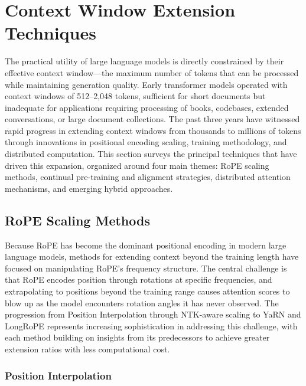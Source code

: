 \documentclass[11pt,letterpaper]{article}
\begin{document}
\section{Context Window Extension Techniques}
\label{sec:window}

The practical utility of large language models is directly constrained by their effective context window---the maximum number of tokens that can be processed while maintaining generation quality. Early transformer models operated with context windows of 512--2,048 tokens, sufficient for short documents but inadequate for applications requiring processing of books, codebases, extended conversations, or large document collections. The past three years have witnessed rapid progress in extending context windows from thousands to millions of tokens through innovations in positional encoding scaling, training methodology, and distributed computation. This section surveys the principal techniques that have driven this expansion, organized around four main themes: RoPE scaling methods, continual pre-training and alignment strategies, distributed attention mechanisms, and emerging hybrid approaches.

\subsection{RoPE Scaling Methods}

Because RoPE \cite{su2024roformer} has become the dominant positional encoding in modern large language models, methods for extending context beyond the training length have focused on manipulating RoPE's frequency structure. The central challenge is that RoPE encodes position through rotations at specific frequencies, and extrapolating to positions beyond the training range causes attention scores to blow up as the model encounters rotation angles it has never observed. The progression from Position Interpolation through NTK-aware scaling to YaRN and LongRoPE represents increasing sophistication in addressing this challenge, with each method building on insights from its predecessors to achieve greater extension ratios with less computational cost.

\subsubsection{Position Interpolation}
\end{document}
